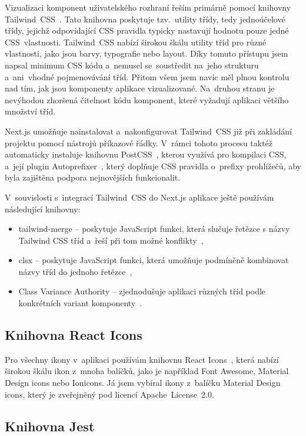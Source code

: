\documentclass[
  biblatex,
  sourcecodes,
  glossaries,
  index
]{kidiplom}
\begin{document}
Vizualizaci komponent uživatelského rozhraní řeším primárně pomocí knihovny Tailwind~CSS~\cite{t25}. Tato knihovna poskytuje tzv.~utility třídy, tedy jednoúčelové třídy, jejichž odpovídající CSS pravidla typicky nastavují hodnotu pouze jedné CSS~vlastnosti. Tailwind~CSS nabízí širokou škálu utility tříd pro různé vlastnosti, jako jsou barvy, typografie nebo layout. Díky tomuto přístupu jsem napsal minimum CSS kódu a~nemusel se~soustředit na~jeho strukturu a~ani~vhodné pojmenovávání tříd. Přitom všem jsem navíc měl plnou kontrolu nad tím, jak jsou komponenty aplikace vizualizované. Na~druhou stranu je nevýhodou zhoršená čitelnost kódu komponent, které vyžadují aplikaci většího množství tříd.

Next.js umožňuje nainstalovat a~nakonfigurovat Tailwind~CSS již při zakládání projektu pomocí nástrojů příkazové řádky. V~rámci tohoto procesu taktéž automaticky instaluje knihovnu PostCSS~\cite{t26}, kterou využívá pro kompilaci CSS, a~její plugin Autoprefixer~\cite{t27}, který doplňuje CSS pravidla o~prefixy prohlížečů, aby byla zajištěna podpora nejnovějších funkcionalit.

V~souvislosti s~integrací Tailwind~CSS do Next.js aplikace ještě používám následující knihovny:
\begin{itemize}
\item tailwind-merge -- poskytuje JavaScript funkci, která slučuje řetězce s názvy Tailwind CSS tříd a~řeší při tom možné konflikty~\cite{t28},
\item clsx -- poskytuje JavaScript funkci, která umožňuje podmíněně kombinovat názvy tříd do jednoho řetězce~\cite{t29},
\item Class Variance Authority -- zjednodušuje aplikaci různých tříd podle konkrétních variant komponenty~\cite{t30}.
\end{itemize}

\subsection{Knihovna React Icons}

Pro všechny ikony v~aplikaci používám knihovnu React Icons~\cite{t31}, která nabízí širokou škálu ikon z~mnoha balíčků, jako je například Font Awesome, Material Design icons nebo Ionicons. Já jsem vybíral ikony z~balíčku Material Design icons, který je zveřejněný pod licencí Apache~License~2.0.


\subsection{Knihovna Jest}
\end{document}
